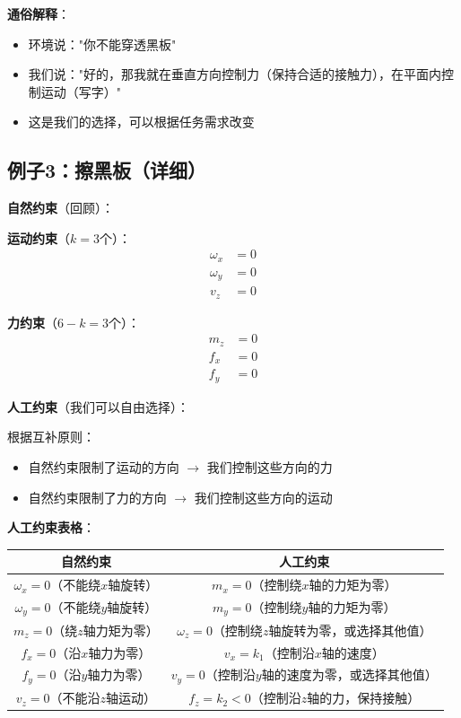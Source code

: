 \documentclass[12pt,a4paper]{article}
\begin{document}
\textbf{通俗解释}：
\begin{itemize}
\item 环境说："你不能穿透黑板"
\item 我们说："好的，那我就在垂直方向控制力（保持合适的接触力），在平面内控制运动（写字）"
\item 这是我们的选择，可以根据任务需求改变
\end{itemize}

\subsection{例子3：擦黑板（详细）}

\textbf{自然约束}（回顾）：

\textbf{运动约束}（$k = 3$个）：
\begin{align}
\omega_x &= 0 \\
\omega_y &= 0 \\
v_z &= 0
\end{align}

\textbf{力约束}（$6-k = 3$个）：
\begin{align}
m_z &= 0 \\
f_x &= 0 \\
f_y &= 0
\end{align}

\textbf{人工约束}（我们可以自由选择）：

根据互补原则：
\begin{itemize}
\item 自然约束限制了运动的方向 $\to$ 我们控制这些方向的力
\item 自然约束限制了力的方向 $\to$ 我们控制这些方向的运动
\end{itemize}

\textbf{人工约束表格}：

\begin{center}
\begin{tabular}{|c|c|}
\hline
\textbf{自然约束} & \textbf{人工约束} \\
\hline
$\omega_x = 0$（不能绕$x$轴旋转） & $m_x = 0$（控制绕$x$轴的力矩为零） \\
$\omega_y = 0$（不能绕$y$轴旋转） & $m_y = 0$（控制绕$y$轴的力矩为零） \\
$m_z = 0$（绕$z$轴力矩为零） & $\omega_z = 0$（控制绕$z$轴旋转为零，或选择其他值） \\
$f_x = 0$（沿$x$轴力为零） & $v_x = k_1$（控制沿$x$轴的速度） \\
$f_y = 0$（沿$y$轴力为零） & $v_y = 0$（控制沿$y$轴的速度为零，或选择其他值） \\
$v_z = 0$（不能沿$z$轴运动） & $f_z = k_2 < 0$（控制沿$z$轴的力，保持接触） \\
\hline
\end{tabular}
\end{center}
\end{document}
